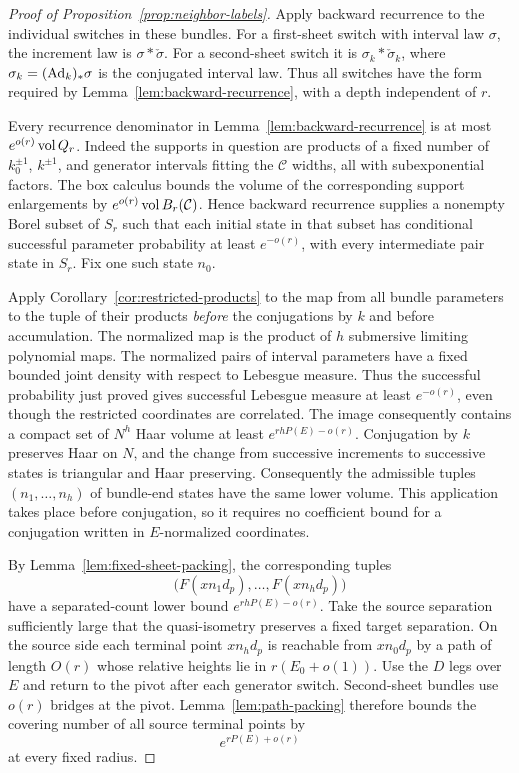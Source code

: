 \begin{proof}[Proof of Proposition~\ref{prop:neighbor-labels}]
Apply backward recurrence to the individual switches in these bundles.
For a first-sheet switch with interval law $\sigma$, the increment law
is $\sigma*\check\sigma$.  For a second-sheet switch it is
$\sigma_k*\check\sigma_k$, where $\sigma_k=(\operatorname{Ad}_k)_*\sigma$ is the conjugated
interval law.
Thus all switches have the form required by
Lemma~\ref{lem:backward-recurrence}, with a depth independent of $r$.

Every recurrence denominator in Lemma~\ref{lem:backward-recurrence}
is at most $e^{o(r)}\operatorname{vol} Q_r$.  Indeed the supports in question are
products of a fixed number of $k_0^{\pm1}$, $k^{\pm1}$, and generator
intervals fitting the $\mathcal C$ widths, all with subexponential
factors.  The box calculus bounds the volume of the corresponding
support enlargements by $e^{o(r)}\operatorname{vol} B_r(\mathcal C)$.
Hence backward recurrence supplies a nonempty Borel subset of $S_r$
such that each initial state in that subset has conditional successful
parameter probability at least $e^{-o(r)}$, with every intermediate
pair state in $S_r$.  Fix one such state $n_0$.

Apply Corollary~\ref{cor:restricted-products} to the map from all bundle
parameters to the tuple of their products \emph{before} the conjugations
by $k$ and before accumulation.  The normalized map is the product of
$h$ submersive limiting polynomial maps.  The normalized pairs of
interval parameters have a fixed bounded joint density with respect
to Lebesgue measure.  Thus the successful probability just proved
gives successful Lebesgue measure at least $e^{-o(r)}$, even though
the restricted coordinates are correlated.  The image consequently
contains a compact set of $N^h$ Haar volume at least
$e^{rhP(E)-o(r)}$.  Conjugation by $k$ preserves Haar on $N$, and the
change from successive increments to successive states is triangular
and Haar preserving.  Consequently the admissible tuples
$(n_1,\ldots,n_h)$ of bundle-end states have the same lower volume.
This application takes place before conjugation, so it requires no
coefficient bound for a conjugation written in $E$-normalized
coordinates.

By Lemma~\ref{lem:fixed-sheet-packing}, the corresponding tuples
\[
 \bigl(F(xn_1d_p),\ldots,F(xn_hd_p)\bigr)
\]
have a separated-count lower bound $e^{rhP(E)-o(r)}$.
Take the source separation sufficiently large that the quasi-isometry
preserves a fixed target separation.  On the source side each terminal
point $xn_hd_p$ is reachable from $xn_0d_p$ by a path of length $O(r)$
whose relative heights lie in $r(E_0+o(1))$.  Use the $D$ legs over $E$
and return to the pivot after each generator switch.  Second-sheet
bundles use $o(r)$ bridges at the pivot.  Lemma~\ref{lem:path-packing}
therefore bounds the covering number of all source terminal points by
\begin{equation}\label{eq:source-reflection-count}
 e^{rP(E)+o(r)}
\end{equation}
at every fixed radius.


\end{proof}
